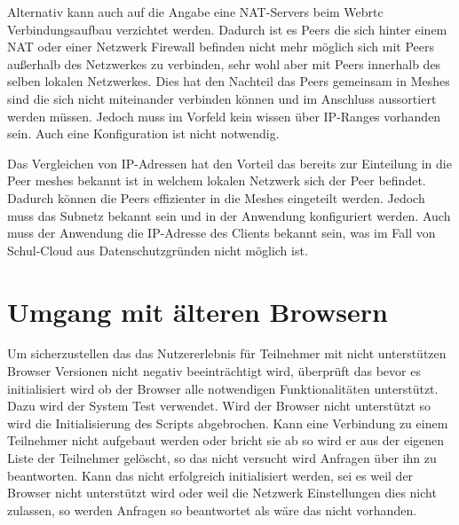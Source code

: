 Alternativ kann auch auf die Angabe eine NAT-Servers beim Webrtc Verbindungsaufbau verzichtet werden. Dadurch ist es Peers die sich hinter einem NAT oder einer Netzwerk Firewall befinden nicht mehr möglich sich mit Peers außerhalb des Netzwerkes zu verbinden, sehr wohl aber mit Peers innerhalb des selben lokalen Netzwerkes. Dies hat den Nachteil das Peers gemeinsam in Meshes sind die sich nicht miteinander verbinden können und im Anschluss aussortiert werden müssen. Jedoch muss im Vorfeld kein wissen über IP-Ranges vorhanden sein. Auch eine Konfiguration ist nicht notwendig. 

Das Vergleichen von IP-Adressen hat den Vorteil das bereits zur Einteilung in die Peer meshes bekannt ist in welchem lokalen Netzwerk sich der Peer befindet. Dadurch können die Peers effizienter in die Meshes eingeteilt werden. Jedoch muss das Subnetz bekannt sein und in der Anwendung konfiguriert werden. Auch muss der Anwendung die IP-Adresse des Clients bekannt sein, was im Fall von Schul-Cloud aus Datenschutzgründen nicht möglich ist.

\section{Umgang mit älteren Browsern}
Um sicherzustellen das das Nutzererlebnis für Teilnehmer mit nicht unterstützen Browser Versionen nicht negativ beeinträchtigt wird, überprüft das \cdn bevor es initialisiert wird ob der Browser alle notwendigen Funktionalitäten unterstützt. Dazu wird der System Test verwendet. Wird der Browser nicht unterstützt so wird die Initialisierung des Scripts abgebrochen. 
Kann eine Verbindung zu einem Teilnehmer nicht aufgebaut werden oder bricht sie ab so wird er aus der eigenen Liste der Teilnehmer gelöscht, so das nicht versucht wird Anfragen über ihn zu beantworten. 
Kann das \cdn nicht erfolgreich initialisiert werden, sei es weil der Browser nicht unterstützt wird oder weil die Netzwerk Einstellungen dies nicht zulassen, so werden Anfragen so beantwortet als wäre das \cdn nicht vorhanden.


